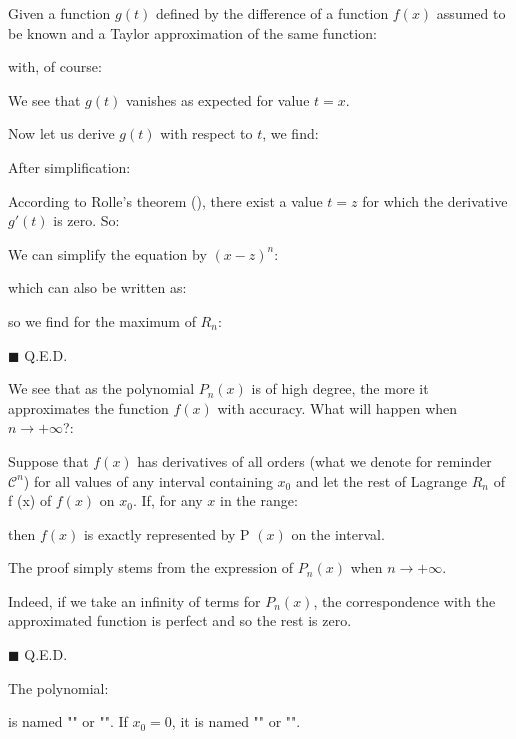 	\begin{dem}
	Given a function $g(t)$ defined by the difference of a function $f(x)$ assumed to be known and a Taylor approximation of the same function:
	
	with, of course:
	
	We see that $g (t)$ vanishes as expected for value $t=x$.
	
	Now let us derive $g(t)$ with respect to $t$, we find:
	
	After simplification:
	
	According to Rolle's theorem (), there exist a value $t=z$ for which the derivative $g'(t)$ is zero. So:
	
	We can simplify the equation by $(x-z)^n$:
	
	which can also be written as:
	
	so we find for the maximum of $R_n$:
	
	\begin{flushright}
		$\blacksquare$  Q.E.D.
	\end{flushright}
	\end{dem}
	We see that as the polynomial $P_n(x)$ is of high degree, the more it approximates the function $f (x)$ with accuracy. What will happen when $n\rightarrow +\infty$?:
	
	Suppose that $f (x)$ has derivatives of all orders (what we denote for reminder $\mathcal{C}^n$) for all values of any interval containing $x_0$ and let the rest of Lagrange $R_n$ of f (x) of $f(x)$ on $x_0$. If, for any $x$ in the range:
	
	then $f (x)$ is exactly represented by P $(x)$ on the interval.
	\begin{dem}
	The proof simply stems from the expression of $P_n(x)$ when $n\rightarrow +\infty$.
	
	Indeed, if we take an infinity of terms for $P_n(x)$, the correspondence with the approximated function is perfect and so the rest is zero.
	\begin{flushright}
		$\blacksquare$  Q.E.D.
	\end{flushright}
	\end{dem}
	The polynomial:
	
	is named "\label{Taylor polynomial}" or "". If $x_0=0$, it is named "" or "".
	
